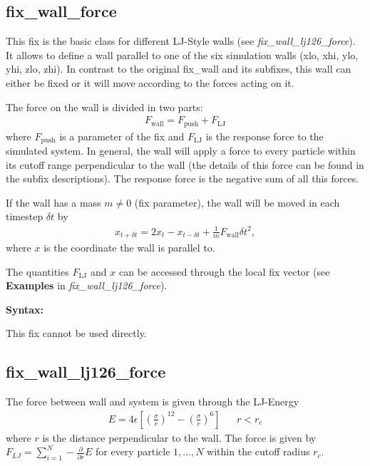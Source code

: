 \subsection{fix\_wall\_force}
\label{sub:fix_wall_force}

This fix is the basic class for different LJ-Style walls (see \emph{fix\_wall\_lj126\_force}). It allows to define a wall parallel to one of the six simulation walls (xlo, xhi, ylo, yhi, zlo, zhi). In contrast to the original fix\_wall and its subfixes, this wall can either be fixed or it will move according to the forces acting on it. 

The force on the wall is divided in two parts:
\begin{align}
  F_\mathrm{wall} = F_\mathrm{push} + F_\mathrm{LJ}
\end{align}
where $F_\mathrm{push}$ is a parameter of the fix and $F_\mathrm{LJ}$ is the response force to the simulated system. In general, the wall will apply a force to every particle within its cutoff range perpendicular to the wall (the details of this force can be found in the subfix descriptions). The response force is the negative sum of all this forces. 

If the wall has a mass $m \neq 0$ (fix parameter), the wall will be moved in each timestep $\delta t$ by
\begin{align}
  x_{t+\delta t} = 2x_t - x_{t-\delta t} + \frac{1}{m} F_\mathrm{wall} \delta t^2,
\end{align}
where $x$ is the coordinate the wall is parallel to.

The quantities $F_\mathrm{LJ}$ and $x$ can be accessed through the local fix vector (see {\bfseries Examples} in \emph{fix\_wall\_lj126\_force}).


{\bfseries Syntax:}

This fix cannot be used directly.

\subsection{fix\_wall\_lj126\_force}
\label{sub:fix_wall_lj126_force}

The force between wall and system is given through the LJ-Energy
\begin{align}
  E = 4\epsilon \left[ \left(\frac{\sigma}{r}\right)^{12}  - \left(\frac{\sigma}{r}\right)^{6} \right] && r < r_c
\end{align}
where $r$ is the distance perpendicular to the wall. The force is given by $F_{LJ} = \sum\limits_{i=1}^N -\frac{\partial}{\partial r} E$ for every particle $1, \ldots, N$ within the cutoff radius $r_c$.



